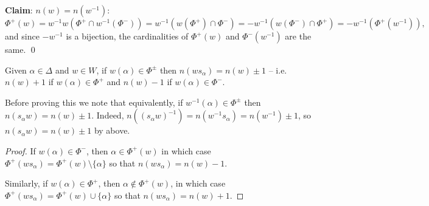 {\bf Claim}: $n(w) = n(w^{-1})$:
\[
    \Phi^+(w) = w^{-1} w \left( \Phi^+ \cap w^{-1} (\Phi^-) \right)
    = w^{-1} \left( w(\Phi^+) \cap \Phi^- \right)
    = - w^{-1} \left( w(\Phi^-) \cap \Phi^+ \right)
    = - w^{-1} \left( \Phi^+(w^{-1}) \right),
\]
and since $-w^{-1}$ is a bijection, the cardinalities of $\Phi^+(w)$ and
$\Phi^-(w^{-1})$ are the same. \qed

\begin{proposition} \label{9.1}
Given $\alpha \in \Delta$ and $w \in W$, if $w(\alpha) \in \Phi^{\pm}$ then
$n(w s_\alpha) = n(w) \pm 1$ -- i.e. $n(w) + 1$ if $w(\alpha) \in \Phi^+$ and
$n(w) - 1$ if $w(\alpha) \in \Phi^-$.
\end{proposition}

Before proving this we note that equivalently, if $w^{-1}(\alpha) \in \Phi^\pm$
then $n(s_\alpha w) = n(w) \pm 1$. Indeed, $n((s_\alpha w)^{-1}) =
n(w^{-1} s_\alpha) = n(w^{-1}) \pm 1$, so $n(s_\alpha w) = n(w) \pm 1$ by above.

\begin{proof}
If $w(\alpha) \in \Phi^-$, then $\alpha \in \Phi^+(w)$ in which case
$\Phi^+(w s_\alpha) = \Phi^+(w) \setminus \{\alpha\}$ so that
$n(w s_\alpha) = n(w) - 1$.

Similarly, if $w(\alpha) \in \Phi^+$, then $\alpha \not\in \Phi^+(w)$, in which
case $\Phi^+(w s_\alpha) = \Phi^+(w) \cup \{\alpha\}$ so that
$n(w s_\alpha) = n(w) + 1$.
\end{proof}
